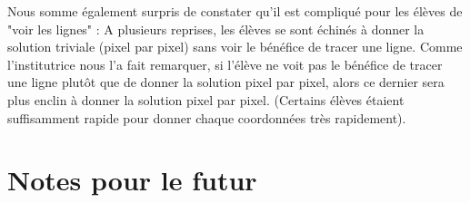 \documentclass{article}
\begin{document}
Nous somme également surpris de constater qu'il est compliqué pour les élèves de "voir les lignes" : A plusieurs reprises, les élèves se sont échinés à donner la solution triviale (pixel par pixel) sans voir le bénéfice de tracer une ligne. Comme l'institutrice nous l'a fait remarquer, si l'élève ne voit pas le bénéfice de tracer une ligne plutôt que de donner la solution pixel par pixel, alors ce dernier sera plus enclin à donner la solution pixel par pixel. (Certains élèves étaient suffisamment rapide pour donner chaque coordonnées très rapidement).


\vspace{2em}


\section{Notes pour le futur}
\end{document}

